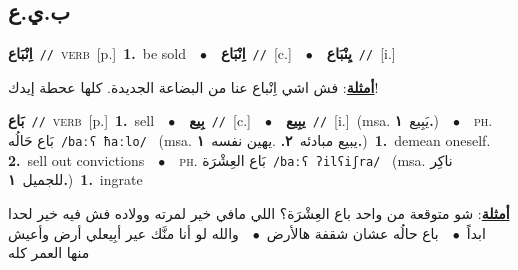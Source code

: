 \documentclass[10pt,a4paper,twoside]{article} %
\begin{document}
\begin{multicols}{2}
\vspace{-3mm}
\subsection*{\color{blue}\foreignlanguage{arabic}{ب.ي.ع}\color{blue}{}} 

{\setlength\topsep{0pt}\textbf{\foreignlanguage{arabic}{اِنْبَاع}}\ {\color{gray}\texttt{//}\color{black}}\ \textsc{verb}\ [p.]\ \textbf{1.}~be sold\ \ $\bullet$\ \ \setlength\topsep{0pt}\textbf{\foreignlanguage{arabic}{اِنْبَاع}}\ {\color{gray}\texttt{//}\color{black}}\ [c.]\ \ $\bullet$\ \ \setlength\topsep{0pt}\textbf{\foreignlanguage{arabic}{يِنْبَاع}}\ {\color{gray}\texttt{//}\color{black}}\ [i.]\  \begin{flushright}\color{gray}\foreignlanguage{arabic}{\textbf{\underline{\foreignlanguage{arabic}{أمثلة}}}: فش اشي اِنْباع عنا من البضاعة الجديدة. كلها عحطة إيدك!}\end{flushright}\color{black}} \vspace{2mm}

{\setlength\topsep{0pt}\textbf{\foreignlanguage{arabic}{بَاع}}\ {\color{gray}\texttt{//}\color{black}}\ \textsc{verb}\ [p.]\ \textbf{1.}~sell\ \ $\bullet$\ \ \setlength\topsep{0pt}\textbf{\foreignlanguage{arabic}{بِيع}}\ {\color{gray}\texttt{//}\color{black}}\ [c.]\ \ $\bullet$\ \ \setlength\topsep{0pt}\textbf{\foreignlanguage{arabic}{يبِيع}}\ {\color{gray}\texttt{//}\color{black}}\ [i.]\ \color{gray}(msa. \foreignlanguage{arabic}{يَبِيع}~\foreignlanguage{arabic}{\textbf{١.}})\color{black}\ \ $\bullet$\ \ \textsc{ph.} \color{gray} \foreignlanguage{arabic}{بَاع حَالُه}\color{black}\ {\color{gray}\texttt{/{\sffamily baːʕ ħaːlo}/}\color{black}}\ \color{gray} (msa. \foreignlanguage{arabic}{يبيع مبادئه}~\foreignlanguage{arabic}{\textbf{٢.}}  .\foreignlanguage{arabic}{يهين نفسه}~\foreignlanguage{arabic}{\textbf{١.}})\color{black}\ \textbf{1.}~demean oneself.  \textbf{2.}~sell out convictions\ \ $\bullet$\ \ \textsc{ph.} \color{gray} \foreignlanguage{arabic}{بَاع العِشْرَة}\color{black}\ {\color{gray}\texttt{/{\sffamily baːʕ ʔilʕiʃra}/}\color{black}}\ \color{gray} (msa. \foreignlanguage{arabic}{ناكِر للجميل}~\foreignlanguage{arabic}{\textbf{١.}})\color{black}\ \textbf{1.}~ingrate\  \begin{flushright}\color{gray}\foreignlanguage{arabic}{\textbf{\underline{\foreignlanguage{arabic}{أمثلة}}}: شو متوقعة من واحد باع العِشْرَة؟ اللي مافي خير لمرته وولاده فش فيه خير لحدا ابداً\ $\bullet$\ \  باع حالُه عشان شقفة هالأرض\ $\bullet$\ \  والله لو أنا منَّك عير أبِيعلي أرض وأعيش منها العمر كله}\end{flushright}\color{black}} \vspace{2mm}


\end{multicols}
\end{document}
